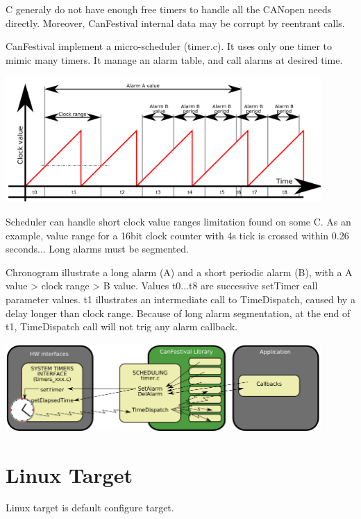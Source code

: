 \documentclass[a4paper,12pt]{book}
\newcommand{\canopen}{CANopen}
\begin{document}
{\textmu}C generaly do not have enough free timers to handle all the
\canopen{} needs directly. Moreover, CanFestival internal data may be
corrupt by reentrant calls. 

CanFestival implement a micro{}-scheduler (timer.c). It uses only one
timer to mimic many timers. It manage an alarm table, and call alarms
at desired time.

\begin{center}
   \includegraphics[width=12cm]{Pictures/100000000000022C000000DEDAD2140C.png}
\end{center}

Scheduler can handle short clock value ranges limitation found on some
{\textmu}C. As an example, value range for a 16bit clock counter with
4{\textmu}s tick is crossed within 0.26 seconds... Long alarms must be
segmented.

Chronogram illustrate a long alarm (A) and a short periodic alarm (B),
with a A value {\textgreater} clock range {\textgreater} B value.
Values t0...t8 are successive setTimer call parameter values. t1
illustrates an intermediate call to TimeDispatch, caused by a delay
longer than clock range. Because of long alarm segmentation, at the end
of t1, TimeDispatch call will not trig any alarm callback.

\begin{center}
   \includegraphics[width=12cm]{Pictures/1000000000000396000000FFC42573DA.png}
\end{center}

\section{Linux Target}
Linux target is default configure target.
\end{document}
